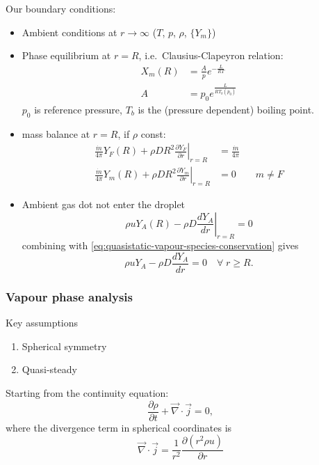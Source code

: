 \documentclass[12pt]{report}
\begin{document}
Our boundary conditions:
\begin{itemize}
\item Ambient conditions at $r \to \infty$ ($T$, $p$, $\rho$, $\{ Y_m \}$)
\item Phase equilibrium at $r = R$, i.e.\ Clausius-Clapeyron relation:
  \begin{align}
    X_m(R) &= \frac{A}{p} e^{-\frac{L}{RT}} \\
    A &= p_0 e^{\frac{L}{RT_b(p_0)}}
  \end{align}
  $p_0$ is reference pressure, $T_b$ is the (pressure dependent) boiling point.
\item mass balance at $r = R$, if $\rho$ const:
  \begin{align}
    \frac{\dot{m}}{4\pi} Y_F(R) + \rho D R^2 \left. \frac{\partial Y_F}{\partial r} \right|_{r=R} &= \frac{\dot{m}}{4\pi} \\
    \frac{\dot{m}}{4\pi} Y_m(R) + \rho D R^2 \left. \frac{\partial Y_m}{\partial r} \right|_{r=R} &= 0 \qquad m \ne F
  \end{align}
\item Ambient gas dot not enter the droplet
  \begin{equation}
    \rho u Y_A(R) - \rho D \left.\frac{d Y_A}{dr}\right|_{r=R} = 0
  \end{equation}
  combining with \eqref{eq:quasistatic-vapour-species-conservation} gives
  \begin{equation}
    \rho u Y_A - \rho D \frac{d Y_A}{dr} = 0 \quad \forall \; r \ge R.
  \end{equation}
\end{itemize}

\subsubsection{Vapour phase analysis}

Key assumptions
\begin{enumerate}
\item Spherical symmetry
\item Quasi-steady
\end{enumerate}

Starting from the continuity equation:
\begin{equation}\label{eq:continuity-eqn}
  \frac{\partial \rho}{\partial t}
  + \vec{\nabla} \cdot \vec{j} = 0,
\end{equation}
where the divergence term in spherical coordinates is
\begin{equation}
  \vec{\nabla} \cdot \vec{j} =
  \frac{1}{r^2} \frac{\partial (r^2 \rho u)}{\partial r}
\end{equation}
\end{document}
